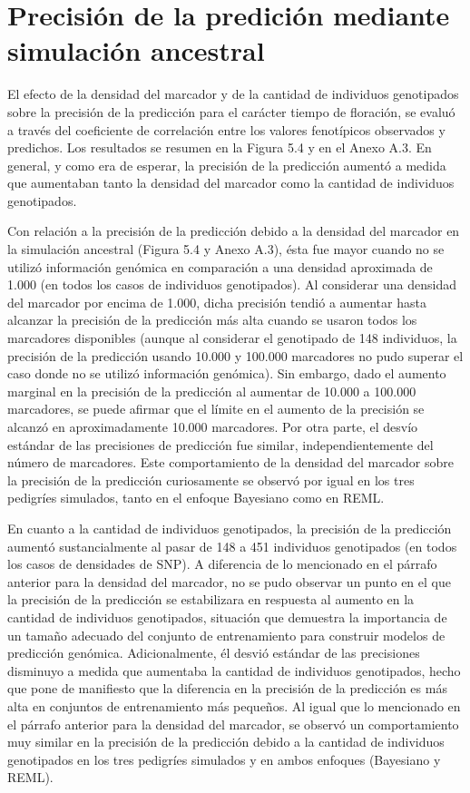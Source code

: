 \documentclass[11pt,spanish,a4paper,oneside,]{book} %
\begin{document}
\hypertarget{precisiuxf3n-de-la-prediciuxf3n-mediante-simulaciuxf3n-ancestral}{%
\section{Precisión de la predición mediante simulación ancestral}\label{precisiuxf3n-de-la-prediciuxf3n-mediante-simulaciuxf3n-ancestral}}

El efecto de la densidad del marcador y de la cantidad de individuos genotipados sobre la precisión de la predicción para el carácter tiempo de floración, se evaluó a través del coeficiente de correlación entre los valores fenotípicos observados y predichos. Los resultados se resumen en la Figura 5.4 y en el Anexo A.3. En general, y como era de esperar, la precisión de la predicción aumentó a medida que aumentaban tanto la densidad del marcador como la cantidad de individuos genotipados.

Con relación a la precisión de la predicción debido a la densidad del marcador en la simulación ancestral (Figura 5.4 y Anexo A.3), ésta fue mayor cuando no se utilizó información genómica en comparación a una densidad aproximada de 1.000 (en todos los casos de individuos genotipados). Al considerar una densidad del marcador por encima de 1.000, dicha precisión tendió a aumentar hasta alcanzar la precisión de la predicción más alta cuando se usaron todos los marcadores disponibles (aunque al considerar el genotipado de 148 individuos, la precisión de la predicción usando 10.000 y 100.000 marcadores no pudo superar el caso donde no se utilizó información genómica). Sin embargo, dado el aumento marginal en la precisión de la predicción al aumentar de 10.000 a 100.000 marcadores, se puede afirmar que el límite en el aumento de la precisión se alcanzó en aproximadamente 10.000 marcadores. Por otra parte, el desvío estándar de las precisiones de predicción fue similar, independientemente del número de marcadores. Este comportamiento de la densidad del marcador sobre la precisión de la predicción curiosamente se observó por igual en los tres pedigríes simulados, tanto en el enfoque Bayesiano como en REML.

En cuanto a la cantidad de individuos genotipados, la precisión de la predicción aumentó sustancialmente al pasar de 148 a 451 individuos genotipados (en todos los casos de densidades de SNP). A diferencia de lo mencionado en el párrafo anterior para la densidad del marcador, no se pudo observar un punto en el que la precisión de la predicción se estabilizara en respuesta al aumento en la cantidad de individuos genotipados, situación que demuestra la importancia de un tamaño adecuado del conjunto de entrenamiento para construir modelos de predicción genómica. Adicionalmente, él desvió estándar de las precisiones disminuyo a medida que aumentaba la cantidad de individuos genotipados, hecho que pone de manifiesto que la diferencia en la precisión de la predicción es más alta en conjuntos de entrenamiento más pequeños. Al igual que lo mencionado en el párrafo anterior para la densidad del marcador, se observó un comportamiento muy similar en la precisión de la predicción debido a la cantidad de individuos genotipados en los tres pedigríes simulados y en ambos enfoques (Bayesiano y REML).
\end{document}
